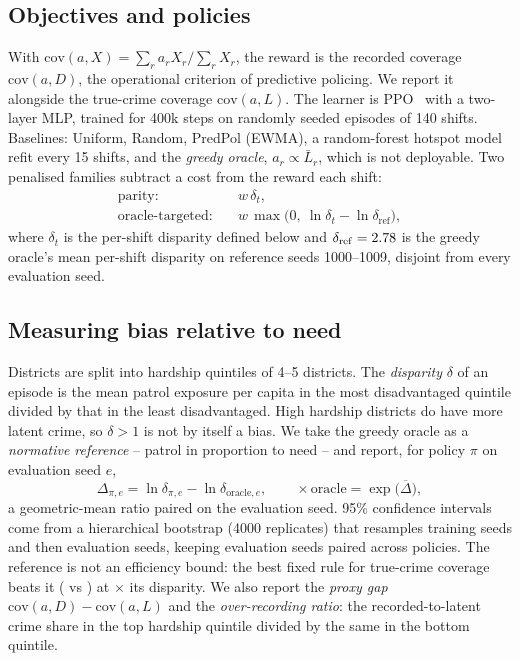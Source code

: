 \subsection{Objectives and policies}
With $\mathrm{cov}(a, X) = \sum_r a_r X_r / \sum_r X_r$, the reward is the
recorded coverage $\mathrm{cov}(a, D)$, the operational criterion of predictive
policing. We report it alongside the true-crime coverage $\mathrm{cov}(a, L)$.
The learner is PPO~\cite{schulman2017ppo, sb3} with a two-layer MLP, trained for
400k steps on randomly seeded episodes of 140 shifts. Baselines: Uniform, Random,
PredPol (EWMA), a random-forest hotspot model refit every 15 shifts, and the
\emph{greedy oracle}, $a_r \propto \bar L_r$, which is not deployable. Two
penalised families subtract a cost from the reward each shift:
\begin{align}
\text{parity:}\quad & w\,\delta_t, \\
\text{oracle-targeted:}\quad & w\,\max\!\big(0,\ \ln\delta_t - \ln\delta_{\mathrm{ref}}\big),
\end{align}
where $\delta_t$ is the per-shift disparity defined below and
$\delta_{\mathrm{ref}} = 2.78$ is the greedy oracle's mean per-shift
disparity on reference seeds 1000--1009, disjoint from every evaluation seed.

\subsection{Measuring bias relative to need}
\label{sec:measure}
Districts are split into hardship quintiles of 4--5 districts. The
\emph{disparity} $\delta$ of an episode is the mean patrol exposure per capita in
the most disadvantaged quintile divided by that in the least disadvantaged. High
hardship districts do have more latent crime, so $\delta>1$ is not by itself a
bias. We take the greedy oracle as a \emph{normative reference} -- patrol in
proportion to need -- and report, for policy $\pi$ on evaluation seed $e$,
\begin{equation}
\Delta_{\pi,e} = \ln\delta_{\pi,e} - \ln\delta_{\mathrm{oracle},e},
\qquad
\times\text{oracle} = \exp\big(\overline{\Delta}\big),
\label{eq:dlog}
\end{equation}
a geometric-mean ratio paired on the evaluation seed. 95\% confidence intervals
come from a hierarchical bootstrap (4000 replicates) that resamples training
seeds and then evaluation seeds, keeping evaluation seeds paired across policies.
The reference is not an efficiency bound: the best fixed rule for true-crime
coverage beats it (\nBRLlat{} vs \nORlat) at \nBRLx$\times$ its disparity. We
also report the \emph{proxy gap} $\mathrm{cov}(a,D)-\mathrm{cov}(a,L)$ and the
\emph{over-recording ratio}: the recorded-to-latent crime share in the top
hardship quintile divided by the same in the bottom quintile.

